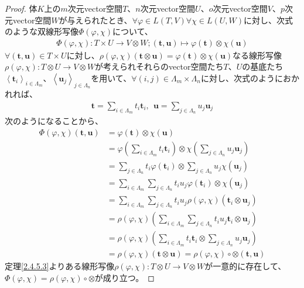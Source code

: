 \documentclass[dvipdfmx]{jsarticle}
\begin{document}
\begin{proof}
体$K$上の$m$次元vector空間$T$、$n$次元vector空間$U$、$o$次元vector空間$V$、$p$次元vector空間$W$が与えられたとき、$\forall\varphi \in L(T,V)\forall\chi \in L(U,W)$に対し、次式のような双線形写像$\varPhi(\varphi,\chi)$について、
\begin{align*}
\varPhi(\varphi,\chi):T \times U \rightarrow V \otimes W;\left( \mathbf{t},\mathbf{u} \right) \mapsto \varphi\left( \mathbf{t} \right) \otimes \chi\left( \mathbf{u} \right)
\end{align*}
$\forall\left( \mathbf{t},\mathbf{u} \right) \in T \times U$に対し、$\rho(\varphi,\chi)\left( \mathbf{t} \otimes \mathbf{u} \right) = \varphi\left( \mathbf{t} \right) \otimes \chi\left( \mathbf{u} \right)$なる線形写像$\rho(\varphi,\chi):T \otimes U \rightarrow V \otimes W$が考えられそれらのvector空間たち$T$、$U$の基底たち$\left\langle \mathbf{t}_{i} \right\rangle_{i \in \varLambda_{m}}$、$\left\langle \mathbf{u}_{j} \right\rangle_{j \in \varLambda_{n}}$を用いて、$\forall(i,j) \in \varLambda_{m} \times \varLambda_{n}$に対し、次式のようにおかれれば、
\begin{align*}
\mathbf{t} = \sum_{i \in \varLambda_{m}} {t_{i}\mathbf{t}_{i}},\ \ \mathbf{u} = \sum_{j \in \varLambda_{n}} {u_{j}\mathbf{u}_{j}}
\end{align*}
次のようになることから、
\begin{align*}
\varPhi(\varphi,\chi)\left( \mathbf{t},\mathbf{u} \right) &= \varphi\left( \mathbf{t} \right) \otimes \chi\left( \mathbf{u} \right)\\
&= \varphi\left( \sum_{i \in \varLambda_{m}} {t_{i}\mathbf{t}_{i}} \right) \otimes \chi\left( \sum_{j \in \varLambda_{n}} {u_{j}\mathbf{u}_{j}} \right)\\
&= \sum_{j \in \varLambda_{n}} {t_{i}\varphi\left( \mathbf{t}_{i} \right)} \otimes \sum_{j \in \varLambda_{n}} {u_{j}\chi\left( \mathbf{u}_{j} \right)}\\
&= \sum_{i \in \varLambda_{m}} {\sum_{j \in \varLambda_{n}} {t_{i}u_{j}\varphi\left( \mathbf{t}_{i} \right) \otimes \chi\left( \mathbf{u}_{j} \right)}}\\
&= \sum_{i \in \varLambda_{m}} {\sum_{j \in \varLambda_{n}} {t_{i}u_{j}\rho(\varphi,\chi)\left( \mathbf{t}_{i} \otimes \mathbf{u}_{j} \right)}}\\
&= \rho(\varphi,\chi)\left( \sum_{i \in \varLambda_{m}} {\sum_{j \in \varLambda_{n}} {t_{i}u_{j}\mathbf{t}_{i} \otimes \mathbf{u}_{j}}} \right)\\
&= \rho(\varphi,\chi)\left( \sum_{i \in \varLambda_{m}} {t_{i}\mathbf{t}_{i}} \otimes \sum_{j \in \varLambda_{n}} {u_{j}\mathbf{u}_{j}} \right)\\
&= \rho(\varphi,\chi)\left( \mathbf{t} \otimes \mathbf{u} \right) = \rho(\varphi,\chi) \circ \otimes \left( \mathbf{t},\mathbf{u} \right)
\end{align*}
定理\ref{2.4.5.3}よりある線形写像$\rho(\varphi,\chi):T \otimes U \rightarrow V \otimes W$が一意的に存在して、$\varPhi(\varphi,\chi) = \rho(\varphi,\chi) \circ \otimes$が成り立つ。
\end{proof}
\end{document}
